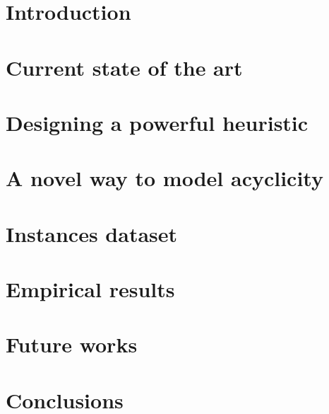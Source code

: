 \documentclass[a4paper,twoside,12pt]{report}
\newcommand\blankpage{%
    \null
    \thispagestyle{empty}%
    \addtocounter{page}{-1}%
    \newpage}
\begin{document}
\afterpage{\blankpage}

\clearpage{\pagestyle{plain}\cleardoublepage}
\tableofcontents

\clearpage{\pagestyle{plain}\cleardoublepage}

\clearpage{\pagestyle{plain}\cleardoublepage}
\chapter{Introduction}


\clearpage{\pagestyle{plain}\cleardoublepage}
\chapter{Current state of the art}


\clearpage{\pagestyle{plain}\cleardoublepage}
\chapter{Designing a powerful heuristic}


\clearpage{\pagestyle{plain}\cleardoublepage}
\chapter{A novel way to model acyclicity}


\clearpage{\pagestyle{plain}\cleardoublepage}
\chapter{Instances dataset}


\clearpage{\pagestyle{plain}\cleardoublepage}
\chapter{Empirical results}


\clearpage{\pagestyle{plain}\cleardoublepage}
\chapter{Future works}


\clearpage{\pagestyle{plain}\cleardoublepage}
\chapter{Conclusions}


\afterpage{\blankpage}
    
\printbibliography
\end{document}
